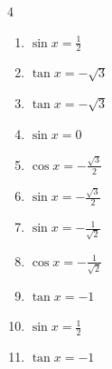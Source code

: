 \begin{multicols}{4}
\begin{enumerate}

  \item $\displaystyle \sin{x}  = \frac{1}{2}$


  \item $\displaystyle \tan{x}  = -\sqrt{3}$


  \item $\displaystyle \tan{x}  = -\sqrt{3}$


  \item $\displaystyle \sin{x}  = 0$


  \item $\displaystyle \cos{x}  = -\frac{\sqrt{3}}{2}$


  \item $\displaystyle \sin{x}  = -\frac{\sqrt{3}}{2}$


  \item $\displaystyle \sin{x}  = -\frac{1}{\sqrt{2}}$


  \item $\displaystyle \cos{x}  = -\frac{1}{\sqrt{2}}$


  \item $\displaystyle \tan{x}  = -1$


\columnbreak %

  \item $\displaystyle \sin{x}  = \frac{1}{2}$


  \item $\displaystyle \tan{x}  = -1$


\end{enumerate}
\end{multicols}
